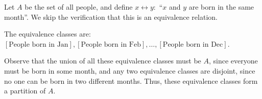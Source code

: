 \begin{example}
    Let $A$ be the set of all people, and define $x\rel y:$ ``$x$ and $y$ are born in the same
    month''.
    We skip the verification that this is an equivalence relation.
    
    The equivalence classes are: $[\text{People born in Jan}], [\text{People born in Feb}], \ldots,
    [\text{People born in Dec}]$.

    Observe that the union of all these equivalence classes must be $A$, since everyone must be born
    in some month, and any two equivalence classes are disjoint, since no one can be born in two different months.
    Thus, these equivalence classes form a partition of $A$.
\end{example}